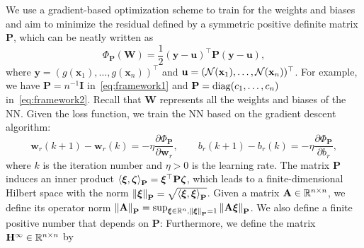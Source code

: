 \documentclass{article} %
\begin{document}
We use a gradient-based optimization scheme to train for the weights and biases and aim to minimize the residual defined by a symmetric positive definite matrix $\mathbf{P}$, which can be neatly written as 
\begin{equation}\label{eq:GeneralLossFunction}
    \Phi_{\mathbf{P}}(\mathbf{W}) = \frac{1}{2} (\mathbf{y} - \mathbf{u})^\top \mathbf{P} (\mathbf{y} - \mathbf{u}),
\end{equation} 
where $\mathbf{y} = (g(\mathbf{x}_1), \ldots, g(\mathbf{x}_n))^\top$ and $\mathbf{u} = ({\mathcal{N}}(\mathbf{x}_1), \ldots, {\mathcal{N}}(\mathbf{x}_n))^\top$. For example, we have $\mathbf{P} = n^{-1} \mathbf{I}$ in~\cref{eq:framework1} and $\mathbf{P} = {\rm diag}(c_1,\ldots,c_n)$ in~\cref{eq:framework2}. Recall that $\mathbf{W}$ represents all the weights and biases of the NN. Given the loss function, we train the NN based on the gradient descent algorithm:
\begin{equation}\label{eq.gradientdescent}
 {\mathbf{w}}_r(k+1) - {\mathbf{w}}_r(k) = -\eta \frac{\partial \Phi_{\mathbf{P}}}{\partial {\mathbf{w}}_r},\qquad 
    {b}_r(k+1) - {b}_r(k) = -\eta \frac{\partial \Phi_{\mathbf{P}}}{\partial {b}_r},
\end{equation}
where $k$ is the iteration number and $\eta > 0$ is the learning rate. The matrix $\mathbf{P}$ induces an inner product $\left\langle \boldsymbol{\xi}, \boldsymbol{\zeta} \right\rangle_\mathbf{P} = \boldsymbol{\xi}^\top \mathbf{P} \boldsymbol{\zeta}$, which leads to a finite-dimensional Hilbert space with the norm $\left\lVert\boldsymbol{\xi}\right\rVert_{\mathbf{P}} = \sqrt{\left\langle \boldsymbol{\xi}, \boldsymbol{\xi} \right\rangle_\mathbf{P}}$. Given a matrix $\mathbf{A} \in \mathbb{R}^{n \times n}$, we define its operator norm %
$\left\lVert\mathbf{A}\right\rVert_{\mathbf{P}} = \sup_{\boldsymbol{\xi} \in \mathbb{R}^n, \left\lVert\boldsymbol{\xi}\right\rVert_{\mathbf{P}} = 1} \left\lVert\mathbf{A} \boldsymbol{\xi}\right\rVert_{\mathbf{P}}$. We also define a finite positive number that depends on $\mathbf{P}$:
 Furthermore, we define the matrix $\mathbf{H}^\infty \in \mathbb{R}^{n \times n}$ by
\end{document}
